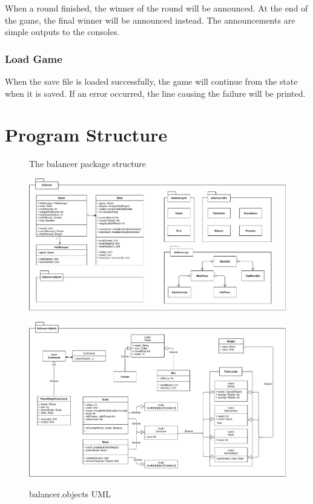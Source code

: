 \documentclass[12pt]{article}
\begin{document}
When a round finished, the winner of the round will be announced. At the end of
the game, the final winner will be announced instead. The announcements are
simple outputs to the consoles.

\subsubsection{Load Game}

When the save file is loaded successfully, the game will continue from the state
when it is saved. If an error occurred, the line causing the failure will be
printed.

\section{Program Structure}

\begin{figure}
  \centering
  \caption{The balancer package structure}
  \includegraphics[width=\textwidth]{UML1.pdf}
  \label{fig:uml1}
  \caption{balancer.objects UML}
  \includegraphics[width=\textwidth]{UML2.pdf}
  \label{fig:uml2}
\end{figure}
\end{document}
